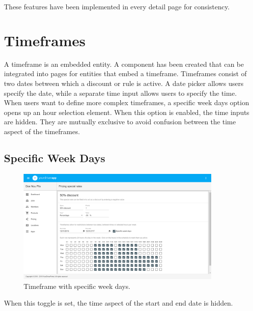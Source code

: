 These features have been implemented in every detail page for consistency.

\section{Timeframes}
A timeframe is an embedded entity. A component has been created that can be integrated into pages for entities that embed a timeframe. Timeframes consist of two dates between which a discount or rule is active. A date picker allows users specify the date, while a separate time input allows users to specify the time. When users want to define more complex timeframes, a specific week days option opens up an hour selection element. When this option is enabled, the time inputs are hidden. They are mutually exclusive to avoid confusion between the time aspect of the timeframes.

\subsection{Specific Week Days}

\begin{figure}[H]
	\centering
	\includegraphics[width=0.9\textwidth]{Timeframes}
	\caption[Timeframe Component]{Timeframe with specific week days.}
	\label{fig:Timeframe Component}
\end{figure}

When this toggle is set, the time aspect of the start and end date is hidden.


